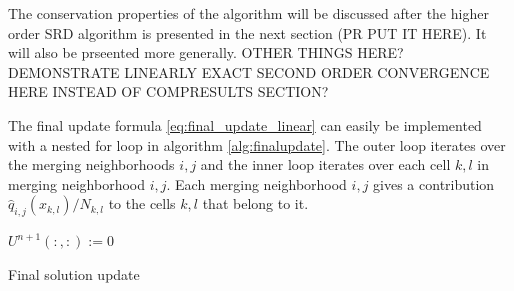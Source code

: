The conservation properties of the algorithm will be discussed after the
higher order SRD algorithm is presented in the next
section (PR PUT IT HERE). It will also be prseented more generally.   
OTHER THINGS HERE? DEMONSTRATE LINEARLY EXACT SECOND ORDER CONVERGENCE
HERE INSTEAD OF COMPRESULTS SECTION?

The final update formula \eqref{eq:final_update_linear} can easily be implemented with a nested for loop in algorithm \ref{alg:finalupdate}.  
The outer loop iterates over the merging neighborhoods $i,j$ and the inner loop iterates over each cell $k,l$ in merging neighborhood $i,j$.  Each merging neighborhood $i,j$ gives a contribution $ \hat{q}_{i,j}(x_{k,l})/N_{k,l} $ to the cells $k,l$ that belong to it.
\begin{algorithm}[H]
\SetAlgoLined
$U^{n+1}(:,:) := 0$\\
 \caption{\sf Final solution update} \label{alg:finalupdate}
\end{algorithm}

